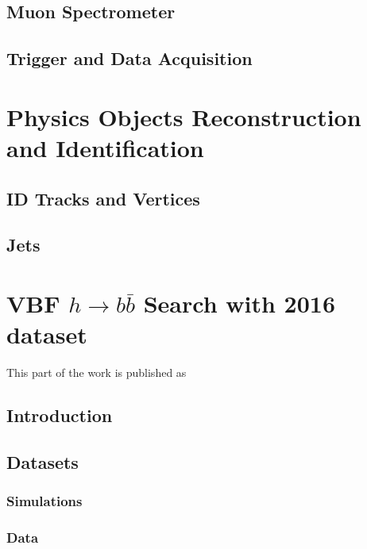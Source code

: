 \documentclass{report}
\begin{document}
\section{Muon Spectrometer}


\section{Trigger and Data Acquisition}


\chapter{Physics Objects Reconstruction and Identification}
\label{chap:reconstruction}


\section{ID Tracks and Vertices}


\section{Jets}

\clearpage

\chapter{VBF $h\rightarrow b\bar{b}$ Search with 2016 dataset}
This part of the work is published as \cite{VBFHbbPaper}
\label{chap:vbf}
\section{Introduction}

\clearpage

\section{Datasets}
\subsection{Simulations}

\subsection{Data}

\clearpage
\end{document}

